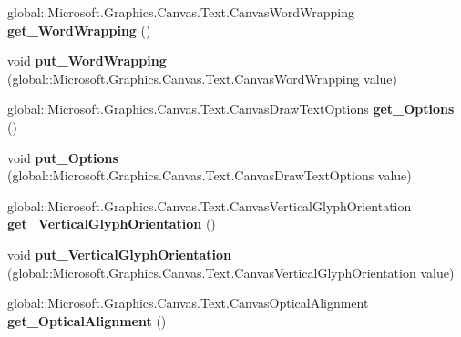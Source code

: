 \begin{DoxyCompactItemize}
global\+::\+Microsoft.\+Graphics.\+Canvas.\+Text.\+Canvas\+Word\+Wrapping {\bfseries get\+\_\+\+Word\+Wrapping} ()
\item 
\mbox{\label{class_microsoft_1_1_graphics_1_1_canvas_1_1_text_1_1_canvas_text_format_a0ca952d56c80bf6bcf1f90158f9900be}} 
void {\bfseries put\+\_\+\+Word\+Wrapping} (global\+::\+Microsoft.\+Graphics.\+Canvas.\+Text.\+Canvas\+Word\+Wrapping value)
\item 
\mbox{\label{class_microsoft_1_1_graphics_1_1_canvas_1_1_text_1_1_canvas_text_format_af5d308c3a1f87b675c1b52eff7c0148c}} 
global\+::\+Microsoft.\+Graphics.\+Canvas.\+Text.\+Canvas\+Draw\+Text\+Options {\bfseries get\+\_\+\+Options} ()
\item 
\mbox{\label{class_microsoft_1_1_graphics_1_1_canvas_1_1_text_1_1_canvas_text_format_a2cb2c8c70a2db084b058574b75fbe1fb}} 
void {\bfseries put\+\_\+\+Options} (global\+::\+Microsoft.\+Graphics.\+Canvas.\+Text.\+Canvas\+Draw\+Text\+Options value)
\item 
\mbox{\label{class_microsoft_1_1_graphics_1_1_canvas_1_1_text_1_1_canvas_text_format_ac501273bff089574992daf9dd1c47eb8}} 
global\+::\+Microsoft.\+Graphics.\+Canvas.\+Text.\+Canvas\+Vertical\+Glyph\+Orientation {\bfseries get\+\_\+\+Vertical\+Glyph\+Orientation} ()
\item 
\mbox{\label{class_microsoft_1_1_graphics_1_1_canvas_1_1_text_1_1_canvas_text_format_a78bb0a96f5140c39fdae9d2808bd58a0}} 
void {\bfseries put\+\_\+\+Vertical\+Glyph\+Orientation} (global\+::\+Microsoft.\+Graphics.\+Canvas.\+Text.\+Canvas\+Vertical\+Glyph\+Orientation value)
\item 
\mbox{\label{class_microsoft_1_1_graphics_1_1_canvas_1_1_text_1_1_canvas_text_format_a531fd44472e54817a9c459cce652d68f}} 
global\+::\+Microsoft.\+Graphics.\+Canvas.\+Text.\+Canvas\+Optical\+Alignment {\bfseries get\+\_\+\+Optical\+Alignment} ()

\end{DoxyCompactItemize}
